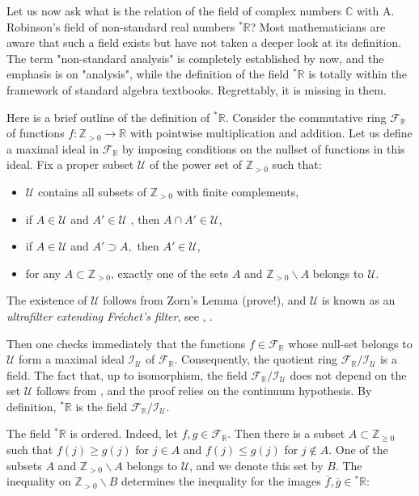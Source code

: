 \documentclass[11pt]{article}
\theoremstyle{plain}
\theoremstyle{definition}
\theoremstyle{remark}
\begin{document}
Let us now ask what is the relation of the field of complex numbers $\mathbb{C}$ with A. Robinson's field of non-standard real numbers $^*\mathbb{R}$? Most mathematicians are aware that such a field exists but have not taken a deeper look at its definition. The term "non-standard analysis" is completely established by now, and the emphasis is on "analysis", while the definition of the field $^*\mathbb{R}$ is totally within the framework of standard algebra textbooks. Regrettably, it is missing in them.
\par
Here is a brief outline of the definition of $^*\mathbb{R}$. Consider the commutative ring $\mathcal{F}_{\mathbb{R}}$ of functions $f:\mathbb{Z}_{>0} \to \mathbb{R}$ with pointwise multiplication and addition. Let us define a maximal ideal in $\mathcal{F}_\mathbb{R}$ by imposing conditions on the nullset of functions in this ideal. Fix a proper subset $\mathcal{U}$ of the power set of $\mathbb{Z}_{>0}$ such that:
\begin{itemize}
    \item $\mathcal{U}$ contains all subsets of $\mathbb{Z}_{>0}$ with finite complements,
    \item if $A \in \mathcal{U}$ and $A' \in \mathcal{U}$ , then $A\cap A' \in \mathcal{U}$,
    \item if $A \in \mathcal{U}$ and $A'\supset  A, $ then $ A' \in \mathcal{U}$,
    \item for any $A \subset \mathbb{Z}_{>0}$, exactly one of the sets $A$ and $\mathbb{Z}_{>0}\backslash  A$ belongs to $\mathcal{U}$.
\end{itemize}
The existence of $\mathcal{U}$ follows from Zorn's Lemma  (prove!), and $\mathcal{U}$ is known as an \textit{ultrafilter extending Fréchet's filter}, see \cite{Garcia}, \cite{Stroyan-Luxemburg}.
\par
Then one checks immediately that the functions $f \in \mathcal{F}_{\mathbb{R}}$ whose null-set belongs to $\mathcal{U}$ form a maximal ideal $\mathcal{I}_\mathcal{U}$ of $\mathcal{F}_{\mathbb{R}}$. Consequently, the quotient ring $\mathcal{F}_{\mathbb{R}} / \mathcal{I}_\mathcal{U}$ is a field. The fact that, up to isomorphism, the field  $\mathcal{F}_{\mathbb{R}} / \mathcal{I}_\mathcal{U}$ does not depend on the set $\mathcal{U}$ follows from \cite{egh}, and the proof relies on the continuum hypothesis. By definition, $^*\mathbb{R}$ is the field $\mathcal{F}_{\mathbb{R}} / \mathcal{I}_\mathcal{U}$.
\par
The field $^*\mathbb{R}$ is ordered. Indeed, let $f,g \in \mathcal{F}_{\mathbb{R}}$. Then there is a subset $A \subset \mathbb{Z}_{\geqslant 0}$ such that $f(j) \geqslant g(j)$ for $j \in A$ and $f(j) \leqslant g(j)$ for $j \notin A$. One of the subsets $A$ and $\mathbb{Z}_{>0} \backslash A$ belongs to $\mathcal{U}$, and we denote this set by $B$. The inequality on $\mathbb{Z}_{>0} \backslash B$ determines the inequality for the images $\overline{f}, \overline{g} \in   {^*\mathbb{R}}$:
\end{document}
